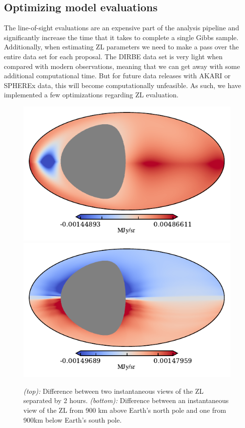 \documentclass{aa}
\begin{document}
\subsection{Optimizing model evaluations}\label{sect:optimization}
The line-of-sight evaluations are an expensive part of the analysis 
pipeline and significantly increase the time that it takes to complete a 
single Gibbs sample. Additionally, when estimating ZL parameters we need 
to make a pass over the entire data set for each proposal. The DIRBE 
data set is very light when compared with modern observations, meaning 
that we can get away with some additional computational time. But for 
future data releases with AKARI or SPHEREx data, this will become 
computationally unfeasible. As such, we have implemented a few 
optimizations regarding ZL evaluation. 
\begin{figure}
    \includegraphics[width=\columnwidth]{figs/cache_error_delta_t.pdf}
    \includegraphics[width=\columnwidth]{figs/cache_error_z.pdf}
    \caption{\textit{(top):} Difference between two instantaneous views 
    of the ZL separated by 2 hours. \textit{(bottom):} Difference 
    between an instantaneous view of the ZL from 900 km above Earth's 
    north pole and one from 900km below Earth's south pole.}    
    \label{fig:cache-error}
\end{figure}
\end{document}
